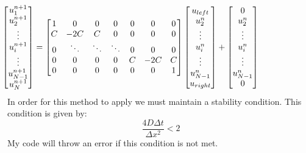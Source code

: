 \documentclass[10pt,letter]{article}
\begin{document}
\begin{equation}
\label{eq:F}
\hspace{-2.5 cm}
\begin{bmatrix}
    u_1^{n+1}\\
    u_2^{n+1}\\
    \vdots \\
    u_i^{n+1} \\
    \vdots \\
    u_{N-1}^{n+1} \\
    u_N^{n+1} \\
\end{bmatrix}
 =
\begin{bmatrix}
    1 & 0 & 0 & 0 & 0 & 0 & 0\\
    C & -2C & C & 0 & 0 & 0 & 0\\
    0 & \ddots & \ddots & \ddots & 0 & 0 & 0\\
    0 & 0 & 0 & 0 & C & -2C & C\\
    0 & 0 & 0 & 0 & 0 & 0 & 1\\
\end{bmatrix}
\begin{bmatrix}
    u_{left} \\
    u_2^n \\
    \vdots \\
    u_i^n \\
    \vdots \\
    u_{N-1}^n \\
    u_{right} \\
\end{bmatrix}
+
\begin{bmatrix}
    0 \\
    u_2^n \\
    \vdots \\
    u_i^n \\
    \vdots \\
    u_{N-1}^n \\
    0 \\
\end{bmatrix}
\end{equation}
In order for this method to apply we must maintain a stability condition. This condition is given by:
\[ \frac{4D\Delta t}{\Delta x^2} < 2\]
My code will throw an error if this condition is not met. 






\end{document}
